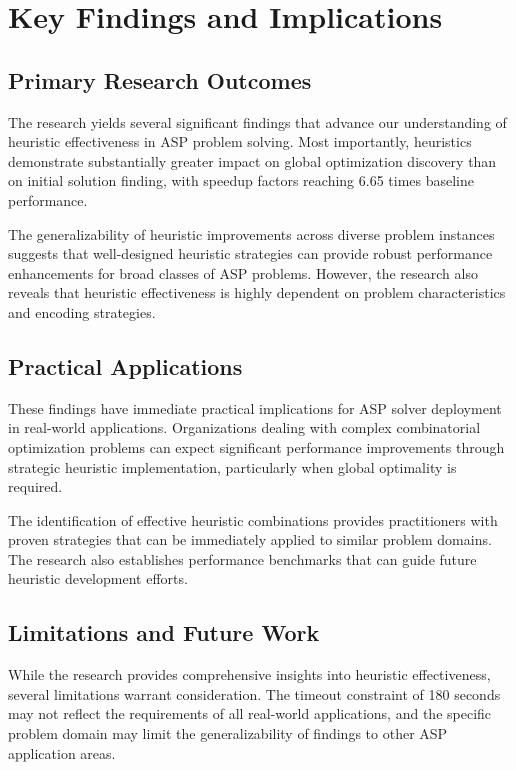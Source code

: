 \documentclass[11pt,a4paper]{article}
\begin{document}
\section{Key Findings and Implications}

\subsection{Primary Research Outcomes}

The research yields several significant findings that advance our understanding of heuristic effectiveness in ASP problem solving. Most importantly, heuristics demonstrate substantially greater impact on global optimization discovery than on initial solution finding, with speedup factors reaching 6.65 times baseline performance.

The generalizability of heuristic improvements across diverse problem instances suggests that well-designed heuristic strategies can provide robust performance enhancements for broad classes of ASP problems. However, the research also reveals that heuristic effectiveness is highly dependent on problem characteristics and encoding strategies.

\subsection{Practical Applications}

These findings have immediate practical implications for ASP solver deployment in real-world applications. Organizations dealing with complex combinatorial optimization problems can expect significant performance improvements through strategic heuristic implementation, particularly when global optimality is required.

The identification of effective heuristic combinations provides practitioners with proven strategies that can be immediately applied to similar problem domains. The research also establishes performance benchmarks that can guide future heuristic development efforts.

\subsection{Limitations and Future Work}

While the research provides comprehensive insights into heuristic effectiveness, several limitations warrant consideration. The timeout constraint of 180 seconds may not reflect the requirements of all real-world applications, and the specific problem domain may limit the generalizability of findings to other ASP application areas.
\end{document}
